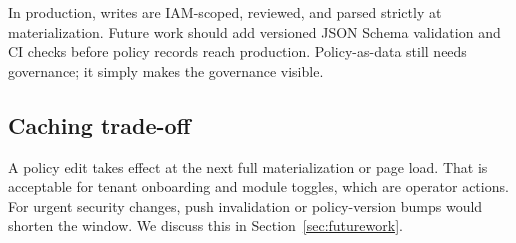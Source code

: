 In production, writes are IAM-scoped, reviewed, and parsed strictly at materialization. Future work should add versioned JSON Schema validation and CI checks before policy records reach production. Policy-as-data still needs governance; it simply makes the governance visible.

\subsection{Caching trade-off}
\label{sec:caching_tradeoff}

A policy edit takes effect at the next full materialization or page load. That is acceptable for tenant onboarding and module toggles, which are operator actions. For urgent security changes, push invalidation or policy-version bumps would shorten the window. We discuss this in Section~\ref{sec:futurework}.
